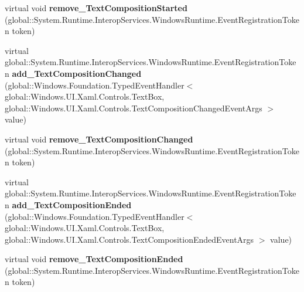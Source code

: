\begin{DoxyCompactItemize}
\item 
\mbox{\label{class_windows_1_1_u_i_1_1_xaml_1_1_controls_1_1_text_box_ad3e96b82e37de938e7295300b6dc9c44}} 
virtual void {\bfseries remove\+\_\+\+Text\+Composition\+Started} (global\+::\+System.\+Runtime.\+Interop\+Services.\+Windows\+Runtime.\+Event\+Registration\+Token token)
\item 
\mbox{\label{class_windows_1_1_u_i_1_1_xaml_1_1_controls_1_1_text_box_a4ea12e73d910d27530312ae26996c11a}} 
virtual global\+::\+System.\+Runtime.\+Interop\+Services.\+Windows\+Runtime.\+Event\+Registration\+Token {\bfseries add\+\_\+\+Text\+Composition\+Changed} (global\+::\+Windows.\+Foundation.\+Typed\+Event\+Handler$<$ global\+::\+Windows.\+U\+I.\+Xaml.\+Controls.\+Text\+Box, global\+::\+Windows.\+U\+I.\+Xaml.\+Controls.\+Text\+Composition\+Changed\+Event\+Args $>$ value)
\item 
\mbox{\label{class_windows_1_1_u_i_1_1_xaml_1_1_controls_1_1_text_box_ae941b45f52cc8e88d708275c4313ef9a}} 
virtual void {\bfseries remove\+\_\+\+Text\+Composition\+Changed} (global\+::\+System.\+Runtime.\+Interop\+Services.\+Windows\+Runtime.\+Event\+Registration\+Token token)
\item 
\mbox{\label{class_windows_1_1_u_i_1_1_xaml_1_1_controls_1_1_text_box_a1ec5fb1c372d817e2d83ca0f4160361d}} 
virtual global\+::\+System.\+Runtime.\+Interop\+Services.\+Windows\+Runtime.\+Event\+Registration\+Token {\bfseries add\+\_\+\+Text\+Composition\+Ended} (global\+::\+Windows.\+Foundation.\+Typed\+Event\+Handler$<$ global\+::\+Windows.\+U\+I.\+Xaml.\+Controls.\+Text\+Box, global\+::\+Windows.\+U\+I.\+Xaml.\+Controls.\+Text\+Composition\+Ended\+Event\+Args $>$ value)
\item 
\mbox{\label{class_windows_1_1_u_i_1_1_xaml_1_1_controls_1_1_text_box_a5973df0b80c264046f580c78b04aeb61}} 
virtual void {\bfseries remove\+\_\+\+Text\+Composition\+Ended} (global\+::\+System.\+Runtime.\+Interop\+Services.\+Windows\+Runtime.\+Event\+Registration\+Token token)
\item 
\mbox{\label{class_windows_1_1_u_i_1_1_xaml_1_1_controls_1_1_text_box_a0f417de69db14b9dda18a6b486367ec7}} 

\end{DoxyCompactItemize}
